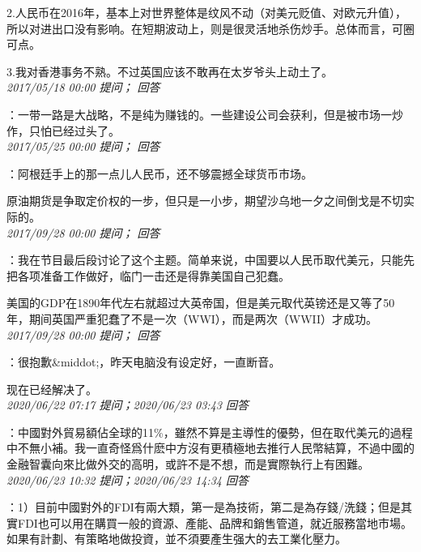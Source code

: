 \documentclass[twocolumn]{ctexart}
\begin{document}
2.人民币在2016年，基本上对世界整体是纹风不动（对美元贬值、对欧元升值），所以对进出口没有影响。在短期波动上，则是很灵活地杀伤炒手。总体而言，可圈可点。

3.我对香港事务不熟。不过英国应该不敢再在太岁爷头上动土了。\\

\textit{\hfill\noindent\small 2017/05/18 00:00 提问； 回答}

：一带一路是大战略，不是纯为赚钱的。一些建设公司会获利，但是被市场一炒作，只怕已经过头了。\\

\textit{\hfill\noindent\small 2017/05/25 00:00 提问； 回答}

：阿根廷手上的那一点儿人民币，还不够震撼全球货币市场。

原油期货是争取定价权的一步，但只是一小步，期望沙乌地一夕之间倒戈是不切实际的。\\

\textit{\hfill\noindent\small 2017/09/28 00:00 提问； 回答}

：我在节目最后段讨论了这个主题。简单来说，中国要以人民币取代美元，只能先把各项准备工作做好，临门一击还是得靠美国自己犯蠢。

美国的GDP在1890年代左右就超过大英帝国，但是美元取代英镑还是又等了50年，期间英国严重犯蠢了不是一次（WWI），而是两次（WWII）才成功。\\

\textit{\hfill\noindent\small 2017/09/28 00:00 提问； 回答}

：很抱歉\&middot;，昨天电脑没有设定好，一直断音。

现在已经解决了。\\

\textit{\hfill\noindent\small 2020/06/22 07:17 提问；2020/06/23 03:43 回答}

：中國對外貿易額佔全球的11\%，雖然不算是主導性的優勢，但在取代美元的過程中不無小補。我一直奇怪爲什麽中方沒有更積極地去推行人民幣結算，不過中國的金融智囊向來比做外交的高明，或許不是不想，而是實際執行上有困難。
\\

\textit{\hfill\noindent\small 2020/06/23 10:32 提问；2020/06/23 14:34 回答}

：1）目前中國對外的FDI有兩大類，第一是為技術，第二是為存錢/洗錢；但是其實FDI也可以用在購買一般的資源、產能、品牌和銷售管道，就近服務當地市場。如果有計劃、有策略地做投資，並不須要產生强大的去工業化壓力。
\end{document}
